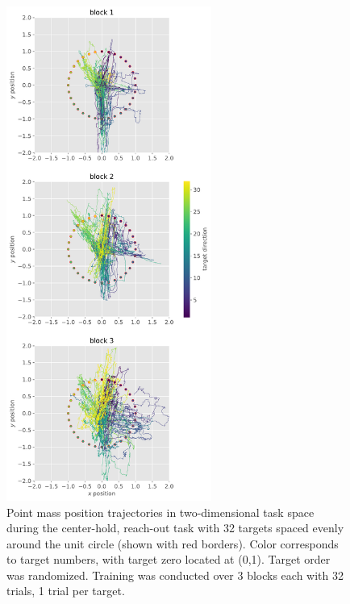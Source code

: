 \documentclass[
  a4paper,
]{article}
\begin{document}
\begin{figure}
\hypertarget{fig:trajectories}{%
\centering
\includegraphics[width=0.6\textwidth,height=\textheight]{images/data_analysis/center_hold/trajectories.pdf}
\caption{Point mass position trajectories in two-dimensional task space
during the center-hold, reach-out task with 32 targets spaced evenly
around the unit circle (shown with red borders). Color corresponds to
target numbers, with target zero located at (0,1). Target order was
randomized. Training was conducted over 3 blocks each with 32 trials, 1
trial per target.}\label{fig:trajectories}
}
\end{figure}
\end{document}
